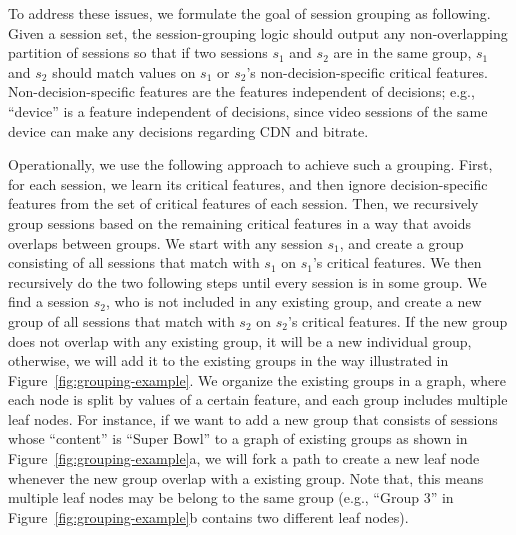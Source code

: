 To address these issues, we formulate the goal of session grouping as following.
Given a session set, the session-grouping logic should output any non-overlapping partition of sessions 
so that if two sessions $s_1$ and $s_2$ are in the same group, $s_1$ and $s_2$ should 
match values on $s_1$ or $s_2$'s non-decision-specific critical features. 
Non-decision-specific features are the features independent of decisions; e.g., ``device'' is a feature independent of decisions, since video sessions of the same device can make any decisions regarding CDN and bitrate.

Operationally, we use the following approach to achieve such a grouping.
First, for each session, we learn its critical features, and then ignore decision-specific features from the set of critical features of each session.
Then, we recursively group sessions based on the remaining critical features in a way that avoids overlaps between groups.
We start with any session $s_1$, and create a group consisting of all sessions that match with $s_1$ on $s_1$'s critical features.
We then recursively do the two following steps until every session is in some group.
We find a session $s_2$, who is not included in any existing group, and create a new group of all sessions that match with $s_2$ on $s_2$'s critical features.
If the new group does not overlap with any existing group, it will be a new individual group, otherwise, we will add it to the existing groups in the way illustrated in Figure~\ref{fig:grouping-example}.
We organize the existing groups in a graph, where each node is split by values of a certain feature, and each group includes multiple leaf nodes.
For instance, if we want to add a new group that consists of sessions whose ``content'' is ``Super Bowl'' to a graph of existing groups as shown in Figure~\ref{fig:grouping-example}a, we will fork a path to create a new leaf node whenever the new group overlap with a existing group.
Note that, this means multiple leaf nodes may be belong to the same group (e.g., ``Group 3'' in Figure~\ref{fig:grouping-example}b contains two different leaf nodes).

